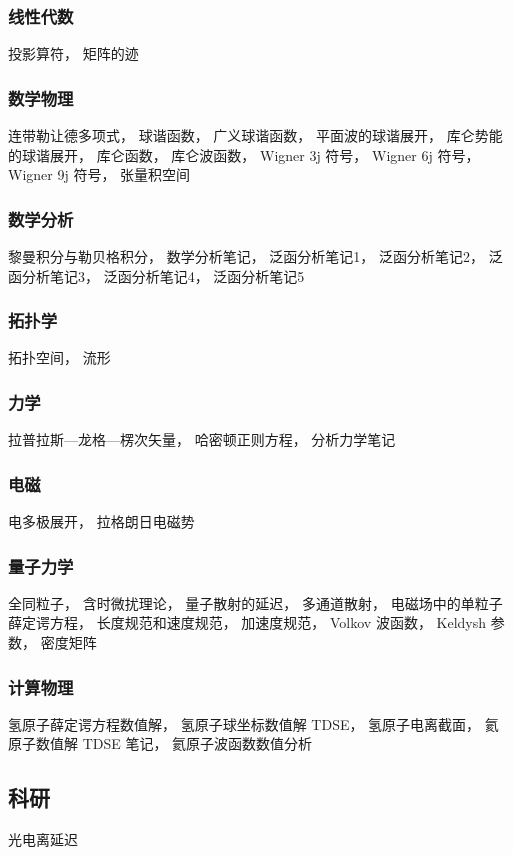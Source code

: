
\subsubsection{线性代数}
投影算符， 矩阵的迹

\subsubsection{数学物理}
连带勒让德多项式， 球谐函数， 广义球谐函数， 平面波的球谐展开， 库仑势能的球谐展开， 库仑函数， 库仑波函数， Wigner 3j 符号， Wigner 6j 符号， Wigner 9j 符号， 张量积空间

\subsubsection{数学分析}
黎曼积分与勒贝格积分， 数学分析笔记， 泛函分析笔记1， 泛函分析笔记2， 泛函分析笔记3， 泛函分析笔记4， 泛函分析笔记5

\subsubsection{拓扑学}
拓扑空间， 流形

\subsubsection{力学}
拉普拉斯—龙格—楞次矢量， 哈密顿正则方程， 分析力学笔记

\subsubsection{电磁}
电多极展开， 拉格朗日电磁势

\subsubsection{量子力学}
全同粒子， 含时微扰理论， 量子散射的延迟， 多通道散射， 电磁场中的单粒子薛定谔方程， 长度规范和速度规范， 加速度规范， Volkov 波函数， Keldysh 参数， 密度矩阵

\subsubsection{计算物理}
氢原子薛定谔方程数值解， 氢原子球坐标数值解 TDSE， 氢原子电离截面， 氦原子数值解 TDSE 笔记， 氦原子波函数数值分析

\subsection{科研}
光电离延迟
